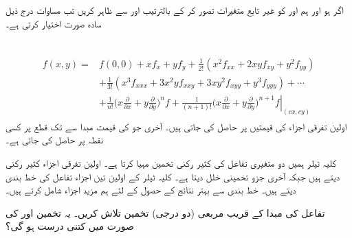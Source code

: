 اگر   ہو اور ہم  اور کو غیر تابع متغیرات تصور کر  کے بالترتیب  اور  سے ظاہر کریں تب  مساوات  درج ذیل سادہ  صورت اختیار کرتی ہے۔

\\
\begin{gather}
\begin{aligned}\label{مساوات_کثیرالمتغیر_دو_متغیری_تفاعل_ٹیلر_کلیہ_ب}
f(x,y)=&f(0,0)+xf_x+yf_y+\frac{1}{2!}(x^2f_{xx}+2xyf_{xy}+y^2f_{yy})\\
&+\frac{1}{3!}(x^3f_{xxx}+3x^2yf_{xxy}+3xy^2f_{xyy}+y^3f_{yyy})+\cdots\\
&+\frac{1}{n!}\big(x\frac{\partial}{\partial x}+y\frac{\partial}{\partial y}\big)^nf+\left.\frac{1}{(n+1)!}\big(x\frac{\partial}{\partial x}+y\frac{\partial}{\partial y}\big)^{n+1}f\right\vert_{(cx,cy)}
\end{aligned}
\end{gather}
اولین  تفرقی اجزاء  کی قیمتیں  پر حاصل کی جاتی ہیں۔ آخری جو کی قیمت  مبدا سے  تک قطع پر کسی نقطہ  پر حاصل کی جاتی ہے۔

کلیہ ٹیلر ہمیں دو متغیری تفاعل  کی کثیر رکنی تخمین مہیا کرتا ہے۔ اولین  تفرقی اجزاء کثیر رکنی دیتے ہیں جبکہ آخری جزو تخمینی خلل دیتا ہے۔ کلیہ ٹیلر کے اولین تین اجزاء  تفاعل کی خط بندی   دیتے ہیں۔ خط بندی سے بہتر نتائج کے حصول کے لئے ہم مزید اجزاء شامل کرتے ہیں۔

تفاعل  کی مبدا کے قریب مربعی (دو درجی) تخمین تلاش کریں۔ یہ تخمین  اور  کی صورت میں کتنی درست ہو گی؟

